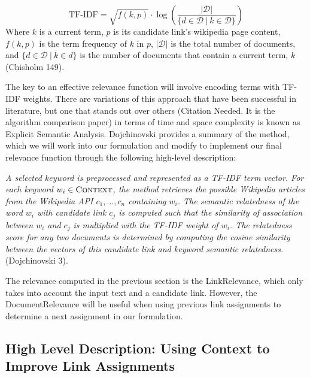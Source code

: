 \documentclass[twoside,11pt]{article}
\begin{document}
$$\mbox{TF-IDF} = \sqrt{f(k, p)} \cdot \log \left( \frac{|\mathcal{D}|}{\{d \in \mathcal{D} \ | \ k \in \mathcal{D}\}} \right) $$
Where $k$ is a current term, $p$ is its candidate link's wikipedia page content, $f(k,p)$ is the term frequency of $k$ in $p$, $|\mathcal{D}|$ is the total number of documents, and $\{d \in \mathcal{D} \ | \ k \in d\}$ is the number of documents that contain a current term, $k$ (Chisholm 149).

The key to an effective relevance function will involve encoding terms with TF-IDF weights. There are variations of this approach that have been successful in literature, but one that stands out over others (Citation Needed. It is the algorithm comparison paper) in terms of time and space complexity is known as Explicit Semantic Analysis. Dojchinovski provides a summary of the method, which we will work into our formulation and modify to implement our final relevance function through the following high-level description:

\textit{A selected keyword is preprocessed and represented as a TF-IDF term vector. For each keyword $w_i \in \mbox{\sc Context}$, the method retrieves the possible Wikipedia articles from the Wikipedia API $c_1,... ,c_n$ containing $w_i$. The semantic relatedness of the word $w_i$ with candidate link $c_j$ is computed such that the similarity of association between $w_i$ and $c_j$ is multiplied with the TF-IDF weight of $w_i$. The relatedness score for any two documents is determined by computing the cosine similarity between the vectors of this candidate link and keyword semantic relatedness.} (Dojchinovski 3).

The relevance computed in the previous section is the {\sc LinkRelevance}, which only takes into account the input text and a candidate link. However, the {\sc DocumentRelevance} will be useful when using previous link assignments to determine a next assignment in our formulation.


\subsection{High Level Description: Using Context to Improve Link Assignments}
\end{document}
